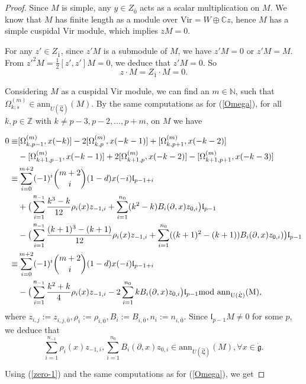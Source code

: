 \documentclass[1p]{elsarticle}
\numberwithin{equation}{section}
\def\dg{\dot{\mathfrak{g}}}
\def\fL{\mathfrak{L}}
\def\mod{\rm mod\,\,}
\def\bC{\mathbb{C}}
\def\bN{\mathbb{N}}
\def\bZ{\mathbb{Z}}
\def\ann{\mathrm{ann}}
\def\Vir{\mathrm{Vir}}
\def\fl{\mathfrak{l}}
\def\hL{\hat{\fL}}
\begin{document}
\begin{proof} Since $M$ is simple, any $y\in Z_{\bar 0}$ acts as a scalar multiplication on $M$. We know that  $M$ has finite length as a module over $\Vir=W\oplus   \bC z$, hence $M$ has a simple cuspidal $\Vir$ module, which implies $z M=0$. 
	
	For any $z'\in Z_{\bar 1}$, since $z'M$ is a submodule of $M$, we have $z'M=0$ or $z'M=M$. From ${z'}^2M=\frac 12 [z',z']M=0$, we deduce that $z' M=0$. So
\begin{equation}\label{zero-0}z\cdot M=Z_{\bar 1}\cdot M=0.\end{equation}

 Considering $M$ as   a    cuspidal $\Vir$ module, we can find an  $m\in \bN$, such that $\Omega_{k, s}^{(m)}\in \ann_{U(\hL)}(M)$. By the same computations as for  (\ref{Omega}),  for all $k,p\in \bZ$ with $k\ne p-3,p-2,\ldots, p+m$, on $M$ we have

\begin{align}
0\equiv& [\Omega_{k,p-1}^{(m)},x(-k)]-2[\Omega_{k,p}^{(m)},x(-k-1)]+[\Omega_{k,p+1}^{(m)},x(-k-2)]\nonumber\\
&-[\Omega_{k+1,p-1}^{(m)},x(-k-1)]+2[\Omega_{k+1,p}^{(m)},x(-k-2)]-[\Omega_{k+1,p+1}^{(m)},x(-k-3)]\nonumber\\
\equiv &\sum\limits_{i=0}^{m+2}(-1)^i\binom{m+2}{i}(1-d)x(-i)\fl_{p-1+i}\\
&+\big(\sum_{i=1}^{n_{-1}} \frac{k^3-k}{12} \rho_i(x)z_{-1,i}+\sum_{i=1}^{n_0}(k^2-k) B_i(\partial,x)z_{0,i}\big)\fl_{p-1}\nonumber\\ &-\big(\sum_{i=1}^{n_{-1}} \frac{(k+1)^3-(k+1)}{12} \rho_i(x)z_{-1,i}+\sum_{i=1}^{n_0}((k+1)^2-(k+1)) B_i(\partial,x)z_{0,i})\big)\fl_{p-1}\nonumber\\
\equiv &\sum\limits_{i=0}^{m+2}(-1)^i\binom{m+2}{i}(1-d)x(-i)\fl_{p-1+i}\\
&-\big(\sum_{i=1}^{n_{-1}} \frac{k^2+k}{4} \rho_i(x)z_{-1,i}-2\sum_{i=1}^{n_0}k B_i(\partial,x)z_{0,i}\big)\fl_{p-1}\nonumber \mod \ann_{U(\hL)}(M),
\end{align}
 where $z_{i,j}:=z_{i,j,\bar 0}, \rho_i:=\rho_{i,\bar 0}, B_{i}:=B_{i,\bar 0}, n_{i}:=n_{i,\bar 0}$.
Since $\fl_{p-1}M\ne0$  for some $p$, we deduce that  \begin{equation}\label{zero-1}\sum_{i=1}^{n_{-1}} \rho_i(x)z_{-1,i}, \sum_{i=1}^{n_0} B_i(\partial,x)z_{0,i}\in \ann_{U(\hL)}(M),\forall x\in \dg.\end{equation}

Using (\ref{zero-1}) and the same computations as for (\ref{Omega}), we get


\end{proof}
\end{document}
